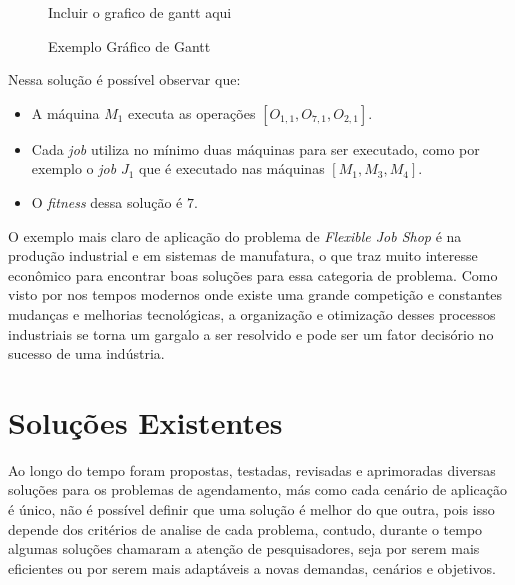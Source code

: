             \begin{figure}[ht]
                \centering
                \small{Incluir o grafico de gantt aqui}
                \caption{Exemplo Gráfico de Gantt}
                \label{fig:plot-gantt}
            \end{figure}
            
            \noindent Nessa solução é possível observar que:
            \begin{itemize}
                \item A máquina $M_1$ executa as operações $[O_{1,1}, O_{7,1}, O_{2,1}]$.
                \item Cada \textit{job} utiliza no mínimo duas máquinas para ser executado, como por exemplo o \textit{job} $J_1$ que é executado nas máquinas $[M_1 , M_3, M_4]$.
                \item O \textit{fitness} dessa solução é $7$.
            \end{itemize}


            O exemplo mais claro de aplicação do problema de \textit{Flexible Job Shop} é na produção industrial e em sistemas de manufatura, o que traz muito interesse econômico para encontrar boas soluções para essa categoria de problema.
            Como visto por \cite{Wari2016} nos tempos modernos onde existe uma grande competição e constantes mudanças e melhorias tecnológicas, a organização e otimização desses processos industriais se torna um gargalo a ser resolvido e pode ser um fator decisório no sucesso de uma indústria.
        
    





\section{Soluções Existentes}
        Ao longo do tempo foram propostas, testadas, revisadas e aprimoradas diversas soluções para os problemas de agendamento, más como cada cenário de aplicação é único, não é possível definir que uma solução é melhor do que outra, pois isso depende dos critérios de analise de cada problema, contudo, durante o tempo algumas soluções chamaram a atenção de pesquisadores, seja por serem mais eficientes ou por serem mais adaptáveis a novas demandas, cenários e objetivos.\\
        
